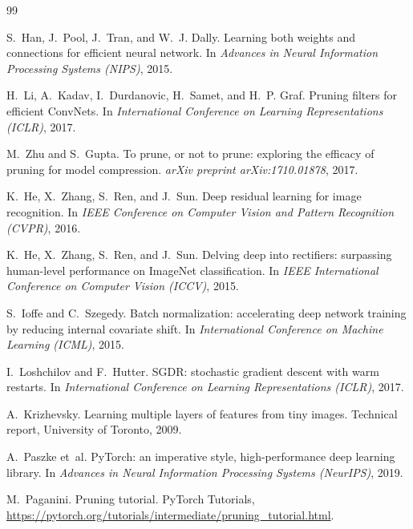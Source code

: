\documentclass[11pt,a4paper]{article}
\begin{document}
\begin{thebibliography}{99}

S.~Han, J.~Pool, J.~Tran, and W.~J. Dally.
\newblock Learning both weights and connections for efficient neural network.
\newblock In \emph{Advances in Neural Information Processing Systems (NIPS)}, 2015.

H.~Li, A.~Kadav, I.~Durdanovic, H.~Samet, and H.~P. Graf.
\newblock Pruning filters for efficient ConvNets.
\newblock In \emph{International Conference on Learning Representations (ICLR)}, 2017.

M.~Zhu and S.~Gupta.
\newblock To prune, or not to prune: exploring the efficacy of pruning for model compression.
\newblock \emph{arXiv preprint arXiv:1710.01878}, 2017.

K.~He, X.~Zhang, S.~Ren, and J.~Sun.
\newblock Deep residual learning for image recognition.
\newblock In \emph{IEEE Conference on Computer Vision and Pattern Recognition (CVPR)}, 2016.

K.~He, X.~Zhang, S.~Ren, and J.~Sun.
\newblock Delving deep into rectifiers: surpassing human-level performance on ImageNet classification.
\newblock In \emph{IEEE International Conference on Computer Vision (ICCV)}, 2015.

S.~Ioffe and C.~Szegedy.
\newblock Batch normalization: accelerating deep network training by reducing internal covariate shift.
\newblock In \emph{International Conference on Machine Learning (ICML)}, 2015.

I.~Loshchilov and F.~Hutter.
\newblock SGDR: stochastic gradient descent with warm restarts.
\newblock In \emph{International Conference on Learning Representations (ICLR)}, 2017.

A.~Krizhevsky.
\newblock Learning multiple layers of features from tiny images.
\newblock Technical report, University of Toronto, 2009.

A.~Paszke et~al.
\newblock PyTorch: an imperative style, high-performance deep learning library.
\newblock In \emph{Advances in Neural Information Processing Systems (NeurIPS)}, 2019.

M.~Paganini.
\newblock Pruning tutorial.
\newblock PyTorch Tutorials, \url{https://pytorch.org/tutorials/intermediate/pruning_tutorial.html}.

\end{thebibliography}
\end{document}
